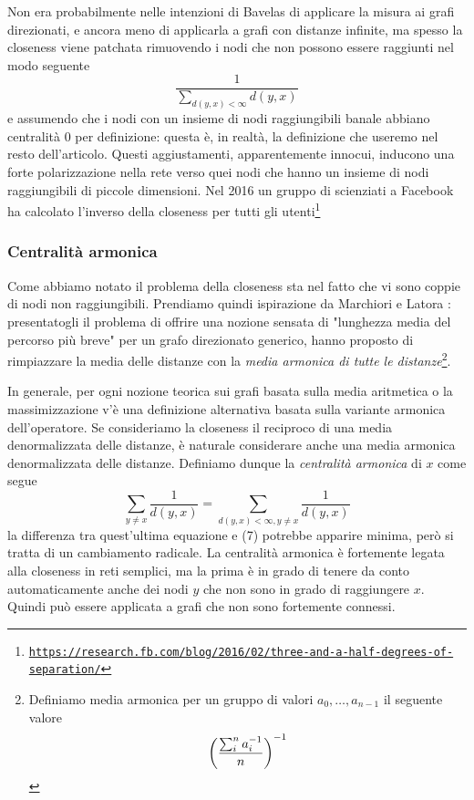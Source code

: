 Non era probabilmente nelle intenzioni di Bavelas di applicare la misura ai grafi direzionati, e ancora meno di applicarla a grafi con distanze infinite, ma spesso la closeness viene patchata rimuovendo i nodi che non possono essere raggiunti nel modo seguente
\begin{equation*}
    \frac{1}{\sum_{d(y, x) < \infty}d(y, x)}
\end{equation*}
e assumendo che i nodi con un insieme di nodi raggiungibili banale abbiano centralità 0 per definizione: questa è, in realtà, la definizione che useremo nel resto dell'articolo. Questi aggiustamenti, apparentemente innocui, inducono una forte polarizzazione nella rete verso quei nodi che hanno un insieme di nodi raggiungibili di piccole dimensioni. Nel 2016 un gruppo di scienziati a Facebook ha calcolato l'inverso della closeness per tutti gli utenti\footnote{\texttt{\href{https://research.fb.com/blog/2016/02/three-and-a-half-degrees-of-separation/}{https://research.fb.com/blog/2016/02/three-and-a-half-degrees-of-separation/}}}
\subsubsection{Centralità armonica}
Come abbiamo notato il problema della closeness sta nel fatto che vi sono coppie di nodi non raggiungibili. Prendiamo quindi ispirazione da Marchiori e Latora \cite{armonica}: presentatogli il problema di offrire una nozione sensata di "lunghezza media del percorso più breve" per un grafo direzionato generico, hanno proposto di rimpiazzare la media delle distanze con la \textit{media armonica di tutte le distanze}\footnote{Definiamo media armonica per un gruppo di valori $a_0, \dots, a_{n - 1}$ il seguente valore
\begin{equation*}
    \left(\frac{\sum_i^n{a_i^{-1}}}{n}\right)^{-1}
\end{equation*}
}.

In generale, per ogni nozione teorica sui grafi basata sulla media aritmetica o la massimizzazione
v'è una definizione alternativa basata sulla variante armonica dell'operatore. Se consideriamo la closeness il reciproco di una media denormalizzata delle distanze, è naturale considerare anche una media armonica denormalizzata delle distanze. Definiamo dunque la \textit{centralità armonica} di $x$ come segue
\begin{equation}
    \sum_{y \neq x}{\frac{1}{d(y, x)}} = \sum_{d(y, x) < \infty, y \neq x}{\frac{1}{d(y, x)}}
\end{equation}
la differenza tra quest'ultima equazione e (7) potrebbe apparire minima, però si tratta di un cambiamento radicale. La centralità armonica è fortemente legata alla closeness in reti semplici, ma la prima è in grado di tenere da conto automaticamente anche dei nodi $y$ che non sono in grado di raggiungere $x$. Quindi può essere applicata a grafi che non sono fortemente connessi.
